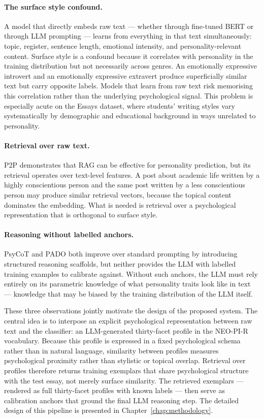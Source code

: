 \documentclass[../main.tex]{subfiles}
\begin{document}
\paragraph{The surface style confound.} A model that directly embeds raw text --- whether through fine-tuned BERT or through LLM prompting --- learns from everything in that text simultaneously: topic, register, sentence length, emotional intensity, and personality-relevant content. Surface style is a confound because it correlates with personality in the training distribution but not necessarily across genres. An emotionally expressive introvert and an emotionally expressive extravert produce superficially similar text but carry opposite labels. Models that learn from raw text risk memorising this correlation rather than the underlying psychological signal. This problem is especially acute on the Essays dataset, where students' writing styles vary systematically by demographic and educational background in ways unrelated to personality.

\paragraph{Retrieval over raw text.} P2P demonstrates that RAG can be effective for personality prediction, but its retrieval operates over text-level features. A post about academic life written by a highly conscientious person and the same post written by a less conscientious person may produce similar retrieval vectors, because the topical content dominates the embedding. What is needed is retrieval over a psychological representation that is orthogonal to surface style.

\paragraph{Reasoning without labelled anchors.} PsyCoT and PADO both improve over standard prompting by introducing structured reasoning scaffolds, but neither provides the LLM with labelled training examples to calibrate against. Without such anchors, the LLM must rely entirely on its parametric knowledge of what personality traits look like in text --- knowledge that may be biased by the training distribution of the LLM itself.

These three observations jointly motivate the design of the proposed system. The central idea is to interpose an explicit psychological representation between raw text and the classifier: an LLM-generated thirty-facet profile in the NEO-PI-R vocabulary. Because this profile is expressed in a fixed psychological schema rather than in natural language, similarity between profiles measures psychological proximity rather than stylistic or topical overlap. Retrieval over profiles therefore returns training exemplars that share psychological structure with the test essay, not merely surface similarity. The retrieved exemplars --- rendered as full thirty-facet profiles with known labels --- then serve as calibration anchors that ground the final LLM reasoning step. The detailed design of this pipeline is presented in Chapter~\ref{chap:methodology}.
\end{document}
